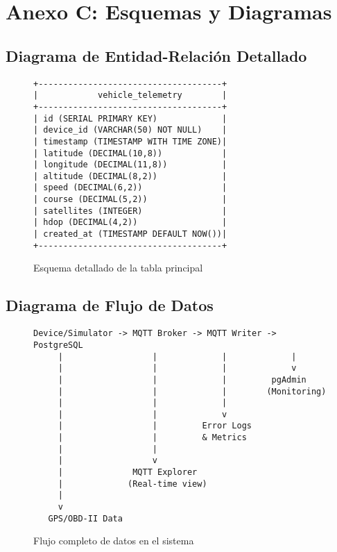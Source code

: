 \section{Anexo C: Esquemas y Diagramas}

\subsection{Diagrama de Entidad-Relación Detallado}

\begin{figure}[H]
    \centering
    \begin{minipage}{0.8\textwidth}
        \begin{verbatim}
+-------------------------------------+
|            vehicle_telemetry        |
+-------------------------------------+
| id (SERIAL PRIMARY KEY)             |
| device_id (VARCHAR(50) NOT NULL)    |
| timestamp (TIMESTAMP WITH TIME ZONE)|
| latitude (DECIMAL(10,8))            |
| longitude (DECIMAL(11,8))           |
| altitude (DECIMAL(8,2))             |
| speed (DECIMAL(6,2))                |
| course (DECIMAL(5,2))               |
| satellites (INTEGER)                |
| hdop (DECIMAL(4,2))                 |
| created_at (TIMESTAMP DEFAULT NOW())|
+-------------------------------------+
        \end{verbatim}
    \end{minipage}
    \caption{Esquema detallado de la tabla principal}
    \label{fig:schema_detallado}
\end{figure}

\subsection{Diagrama de Flujo de Datos}

\begin{figure}[H]
    \centering
    \begin{minipage}{0.8\textwidth}
        \begin{verbatim}
Device/Simulator -> MQTT Broker -> MQTT Writer -> PostgreSQL
     |                  |             |             |
     |                  |             |             v
     |                  |             |         pgAdmin
     |                  |             |        (Monitoring)
     |                  |             |
     |                  |             v
     |                  |         Error Logs
     |                  |         & Metrics
     |                  |
     |                  v
     |              MQTT Explorer
     |             (Real-time view)
     |
     v
   GPS/OBD-II Data
        \end{verbatim}
    \end{minipage}
    \caption{Flujo completo de datos en el sistema}
    \label{fig:flujo_datos}
\end{figure}


